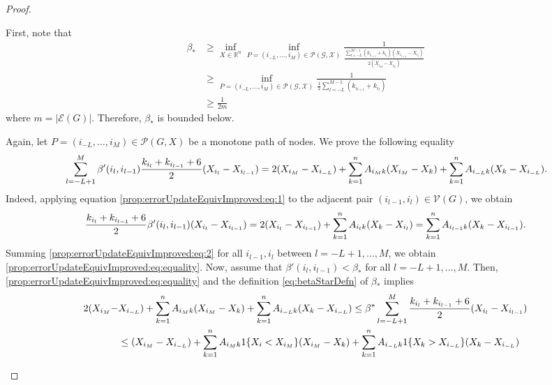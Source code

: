 \documentclass{article}
\theoremstyle{remark}
\newcommand{\R}[0]{\mathbb{R}}
\begin{document}
\begin{proof}
\begin{enumerate}
			First, note that
			\begin{align}
				\beta_* &\geq \inf_{X\in\R^n}\inf_{P=(i_{-L},\ldots,i_M)\in\mathcal{P(G,X)}}\frac{1}{\frac{\sum_{l=-L}^{M-1}(k_{i_{l+1}}+k_{i_{l}})(X_{i_{l+1}}-X_{i_l})}{2(X_{i_M}-X_{i_L})}}\\
					&\geq\inf_{P=(i_{-L},\ldots,i_M)\in\mathcal{P(G,X)}}\frac{1}{\frac{1}{2}\sum_{l=-L}^{M-1}(k_{i_{l+1}}+k_{i_l})}\\
					&\geq \frac{1}{2m}
			\end{align}
			where $m=|\mathcal{E}(G)|$. Therefore, $\beta_*$ is bounded below.

			Again, let $P=(i_{-L},\ldots,i_M)\in\mathcal{P}(G,X)$ be a monotone path of nodes. We prove the following equality
			\begin{equation}{\label{prop:errorUpdateEquivImproved:eq:equality}}
				\sum_{l=-L+1}^{M}\beta'(i_{l},i_{l-1})\frac{k_{i_{l}}+k_{i_{l-1}}+6}{2}(X_{i_l}-X_{i_{l-1}}) = 2(X_{i_{M}}-X_{i_{-L}}) + \sum_{k=1}^nA_{i_Mk}(X_{i_M}-X_k) + \sum_{k=1}^nA_{i_{-L}k}(X_k-X_{i_{-L}}).
			\end{equation}
			Indeed, applying equation \eqref{prop:errorUpdateEquivImproved:eq:1} to the adjacent pair $(i_{l-1},i_l)\in\mathcal{V}(G)$, we obtain
			\begin{equation}{\label{prop:errorUpdateEquivImproved:eq:2}}
				\frac{k_{i_l}+k_{i_{l-1}}+6}{2}\beta'(i_l,i_{l-1})(X_{i_l}-X_{i_{l-1}}) = 2(X_{i_{l}}-X_{i_{l-1}}) + \sum_{k=1}^nA_{i_lk}(X_{k}-X_{i_l})  = \sum_{k=1}^nA_{i_{l-1}k}(X_k-X_{i_{l-1}}). 
			\end{equation}
			Summing \eqref{prop:errorUpdateEquivImproved:eq:2} for all $i_{l-1},i_l$ between $l=-L+1,\ldots,M$, we obtain \eqref{prop:errorUpdateEquivImproved:eq:equality}. Now, assume that $\beta'(i_l,i_{l-1})<\beta_*$ for all $l=-L+1,\ldots,M$. Then, \eqref{prop:errorUpdateEquivImproved:eq:equality} and the definition \eqref{eq:betaStarDefn} of $\beta_*$ implies
			\begin{equation}{\label{prop:errorUpdateEquivImproved:eq:summedBeta}}
			\begin{aligned}
				2(X_{i_{M}}-&X_{i_{-L}}) + \sum_{k=1}^nA_{i_Mk}(X_{i_M}-X_k) + \sum_{k=1}^nA_{i_{-L}k}(X_k-X_{i_{-L}}) 
			\leq \beta^*\sum_{l=-L+1}^{M}\frac{k_{i_{l}}+k_{i_{l-1}}+6}{2}(X_{i_l}-X_{i_{l-1}})\\ 
					    &\leq (X_{i_M}-X_{i_{-L}}) + \sum_{k=1}^nA_{i_Mk}1\{X_{i}<X_{i_M}\}(X_{i_M}-X_k) + \sum_{k=1}^nA_{i_{-L}k}1\{X_k>X_{i_{-L}}\}(X_k-X_{i_{-L}})
			\end{aligned}
			\end{equation}

\end{enumerate}
\end{proof}
\end{document}
